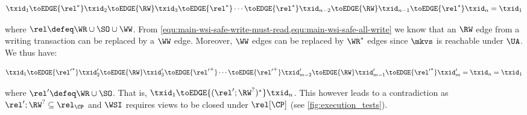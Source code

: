 {\displaymathfont
\[
    \txid_1 \toEDGE{\rel^*} \txid_2 \toEDGE{\RW} \txid_3 \toEDGE{\rel^*} \cdots \toEDGE{\rel^*} \txid_{n-2} \toEDGE{\RW} \txid_{n-1} \toEDGE{\rel^*} \txid_n = \txid_1
\]
\normalsize}

\noindent where \( \rel \defeq \WR \cup \SO \cup \WW \).
From \cref{equ:main-wsi-safe-write-must-read,equ:main-wsi-safe-all-write} we know that 
an \( \RW \) edge from a writing transaction can be replaced by a \( \WW \) edge.
Moreover, \( \WW \) edges can be replaced by \( \WR^* \) edges since \( \mkvs \) is reachable under \( \UA \).
We thus have:

{\displaymathfont
\[
    \txid_1 \toEDGE{{\rel'}^*} \txid'_2 \toEDGE{\RW} \txid'_3 \toEDGE{{\rel'}^+} \cdots \toEDGE{{\rel'}^+} \txid'_{m-2} \toEDGE{\RW} \txid'_{m-1} \toEDGE{{\rel'}^*} \txid'_m = \txid_n = \txid_1
\]
\normalsize}

\noindent where \( \rel' \defeq \WR \cup \SO \).
That is, \( \txid_1 \toEDGE{( \rel'; \RW^? )^* } \txid_n \).
This however leads to a contradiction as \( \rel'; \RW^? \subseteq \rel_\CP \) and 
\( \WSI \) requires views to be closed under \( \rel[\CP] \) (see \cref{fig:execution_tests}). 



